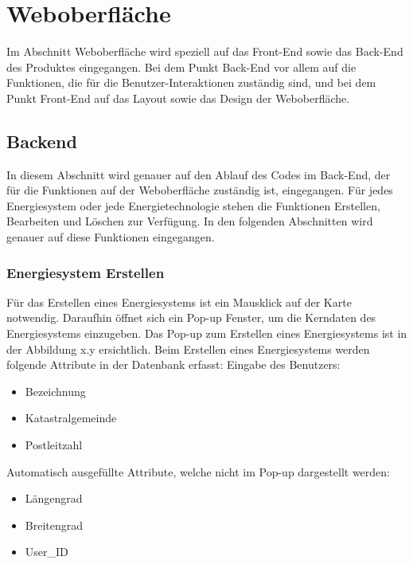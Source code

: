 \newpage
\section{Weboberfläche}
Im Abschnitt Weboberfläche wird speziell auf das Front-End sowie das Back-End des Produktes eingegangen. Bei dem Punkt Back-End vor allem auf die Funktionen, die für die Benutzer-Interaktionen zuständig sind, und bei dem Punkt Front-End auf das Layout sowie das Design der Weboberfläche.


\subsection{Backend}
In diesem Abschnitt wird genauer auf den Ablauf des Codes im Back-End, der für die Funktionen auf der Weboberfläche zuständig ist, eingegangen. 
Für jedes Energiesystem oder jede Energietechnologie stehen die Funktionen Erstellen, Bearbeiten und Löschen zur Verfügung. In den folgenden Abschnitten wird genauer auf diese Funktionen eingegangen.


\subsubsection{Energiesystem Erstellen}
Für das Erstellen eines Energiesystems ist ein Mausklick auf der Karte notwendig. Daraufhin öffnet sich ein Pop-up Fenster, um die Kerndaten des Energiesystems einzugeben.
Das Pop-up zum Erstellen eines Energiesystems ist in der Abbildung x.y ersichtlich.
Beim Erstellen eines Energiesystems werden folgende Attribute in der Datenbank erfasst:
Eingabe des Benutzers:
\begin{itemize}
	\item Bezeichnung 
	\item Katastralgemeinde
	\item Postleitzahl
\end{itemize}

Automatisch ausgefüllte Attribute, welche nicht im Pop-up dargestellt werden:
\begin{itemize}
	\item Längengrad 
	\item Breitengrad
	\item User\_ID
\end{itemize}


